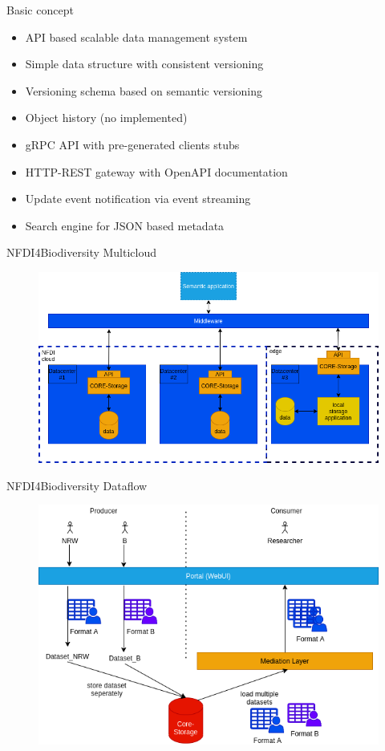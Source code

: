 \documentclass[aspectratio=169]{beamer}
\begin{document}
	\begin{frame}{Basic concept}
		\begin{itemize}
			\item API based scalable data management system
			\item Simple data structure with consistent versioning
			\item Versioning schema based on semantic versioning
			\item Object history (no implemented)
			\item gRPC API with pre-generated clients stubs
			\item HTTP-REST gateway with OpenAPI documentation
			\item Update event notification via event streaming
			\item Search engine for JSON based metadata
		\end{itemize}
		
	\end{frame}
	\begin{frame}{NFDI4Biodiversity Multicloud}
		\begin{figure}
			\includegraphics[scale=0.52]{../../images/NFDIMulticloudconcept.png}
		\end{figure}
	\end{frame}
	\begin{frame}{NFDI4Biodiversity Dataflow}
		\begin{figure}
			\includegraphics[scale=0.52]{../../images/DataFlowOdonata.png}
		\end{figure}
	\end{frame}
\end{document}
